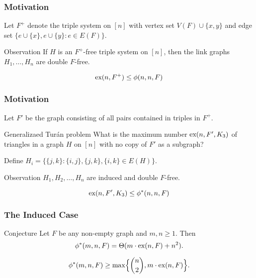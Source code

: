 \documentclass{beamer}
\newcommand*{\ex}{\textnormal{ex}}
\begin{document}
\begin{frame}

  \frametitle{Motivation}

  Let $F^+$ denote the triple system on $[n]$ with vertex set $V(F) \cup \{x, y\}$ and edge set $\{e \cup \{x\}, e \cup \{y\} : e \in E(F)\}$.

  \pause

  \vspace{0.5cm}

  \begin{block}{Observation}
    If $H$ is an $F^+$-free triple system on $[n]$, then the link graphs $H_1, \ldots, H_n$ are double $F$-free.
  \end{block}

  \pause

  \vspace{0.5cm}

  \[
    \ex(n, F^+) \leq \phi(n, n, F)
  \]
\end{frame}

\begin{frame}

  \frametitle{Motivation}

  Let $F'$ be the graph consisting of all pairs contained in triples in $F^+$. 

  \begin{block}{Generalizaed Turán problem}
    What is the maximum number $\ex(n, F', K_3)$ of triangles in a graph $H$ on $[n]$ with no copy of $F'$ as a subgraph?
  \end{block}

  \pause

  \vspace{0.3cm}

  Define $H_i = \{\{j, k\} : \{i, j\}, \{j, k\}, \{i, k\} \in E(H)\}$.

  \pause

  \begin{block}{Observation}
    $H_1, H_2, \ldots, H_n$ are induced and double $F$-free.
  \end{block}

  \pause

  \vspace{0.3cm}

  \[
    \ex(n, F', K_3) \leq \phi^*(n, n, F)
  \]
\end{frame}

\begin{frame}
  \frametitle{The Induced Case}

  \begin{block}{Conjecture}
    Let $F$ be any non-empty graph and $m, n \geq 1$. Then
    \[ 
      \phi^*(m,n,F) = \Theta(m \cdot \ex(n,F) + n^2).
    \]
  \end{block}

  \pause

  \vspace{0.3cm}

  \[ 
    \phi^*(m,n,F) \geq \max\Bigl\{\binom{n}{2},m\cdot \ex(n,F)\Bigr\}.
  \]
\end{frame}
\end{document}
